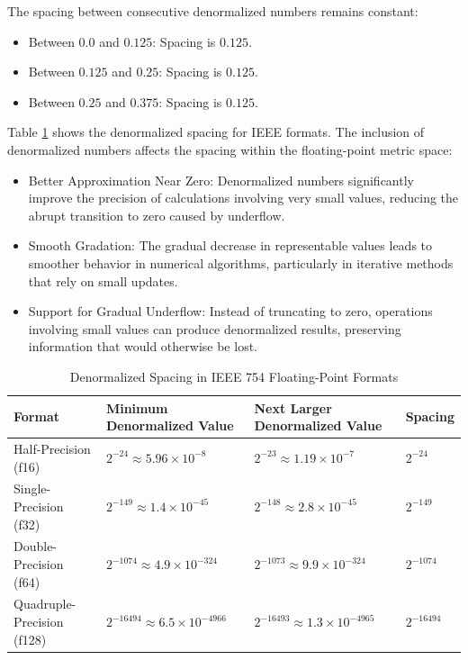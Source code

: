 \vspace{\baselineskip}\par
\noindent 
The spacing between consecutive denormalized numbers remains constant:
\begin{itemize}
    \item Between \( 0.0 \) and \( 0.125 \): Spacing is \( 0.125 \).
    \item Between \( 0.125 \) and \( 0.25 \): Spacing is \( 0.125 \).
    \item Between \( 0.25 \) and \( 0.375 \): Spacing is \( 0.125 \).
\end{itemize}

Table \ref{tab:denormalized_spacing} shows the denormalized spacing for IEEE formats. The inclusion of denormalized numbers affects the spacing within the floating-point metric space:
\begin{itemize}
    \item Better Approximation Near Zero: Denormalized numbers significantly improve the precision of calculations involving very small values, reducing the abrupt transition to zero caused by underflow.
    \item Smooth Gradation: The gradual decrease in representable values leads to smoother behavior in numerical algorithms, particularly in iterative methods that rely on small updates.
    \item Support for Gradual Underflow: Instead of truncating to zero, operations involving small values can produce denormalized results, preserving information that would otherwise be lost.
\end{itemize}

\begin{table}[h!]
\centering
\renewcommand{\arraystretch}{1.3} %
\setlength{\tabcolsep}{6pt} %
\caption{Denormalized Spacing in IEEE 754 Floating-Point Formats}
\label{tab:denormalized_spacing}
\begin{tabular}{|p{3.5cm}|p{4cm}|p{4cm}|p{1.5cm}|}
\hline
\textbf{Format}          & \textbf{Minimum Denormalized Value} & \textbf{Next Larger Denormalized Value} & \textbf{Spacing} \\ \hline
Half-Precision (f16)     & \( 2^{-24} \approx 5.96 \times 10^{-8} \) & \( 2^{-23} \approx 1.19 \times 10^{-7} \) & \( 2^{-24} \) \\ \hline
Single-Precision (f32)   & \( 2^{-149} \approx 1.4 \times 10^{-45} \) & \( 2^{-148} \approx 2.8 \times 10^{-45} \) & \( 2^{-149} \) \\ \hline
Double-Precision (f64)   & \( 2^{-1074} \approx 4.9 \times 10^{-324} \) & \( 2^{-1073} \approx 9.9 \times 10^{-324} \) & \( 2^{-1074} \) \\ \hline
Quadruple-Precision (f128) & \( 2^{-16494} \approx 6.5 \times 10^{-4966} \) & \( 2^{-16493} \approx 1.3 \times 10^{-4965} \) & \( 2^{-16494} \) \\ \hline
\end{tabular}
\end{table}


